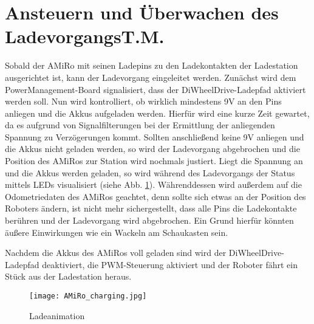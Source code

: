 \section[Ansteuern und Überwachen des Ladevorgangs]{Ansteuern und Überwachen des Ladevorgangs\hfill {\normalsize T.M.}}\label{kap:ladevorgang} %

Sobald der AMiRo mit seinen Ladepins zu den Ladekontakten der Ladestation ausgerichtet ist, kann der Ladevorgang eingeleitet werden.
Zunächst wird dem PowerManagement-Board signalisiert, dass der DiWheelDrive-Ladepfad aktiviert werden soll. Nun wird kontrolliert, ob wirklich mindestens 9V an den Pins anliegen und die Akkus aufgeladen werden. Hierfür wird eine kurze Zeit gewartet, da es aufgrund von Signalfilterungen bei der Ermittlung der anliegenden Spannung zu Verzögerungen kommt. Sollten anschließend keine 9V anliegen und die Akkus nicht geladen werden, so wird der Ladevorgang abgebrochen und die Position des AMiRos zur Station wird nochmals justiert.
Liegt die Spannung an und die Akkus werden geladen, so wird während des Ladevorgangs der Status mittels LEDs visualisiert (siehe Abb. \ref{fig:amiro_charging}). 
Währenddessen wird außerdem auf die Odometriedaten des AMiRos geachtet, denn sollte sich etwas an der Position des Roboters ändern, ist nicht mehr sichergestellt, dass alle Pins die Ladekontakte berühren und der Ladevorgang wird abgebrochen. Ein Grund hierfür könnten äußere Einwirkungen wie ein Wackeln am Schaukasten sein.

Nachdem die Akkus des AMiRos voll geladen sind wird der DiWheelDrive-Ladepfad deaktiviert, die PWM-Steuerung aktiviert und der Roboter fährt ein Stück aus der Ladestation heraus.

\begin{figure}[]
	\begin{center}
		\texttt{[image: AMiRo\_charging.jpg]} 	
		\caption{Ladeanimation}
		\label{fig:amiro_charging}
	\end{center}
\end{figure}



